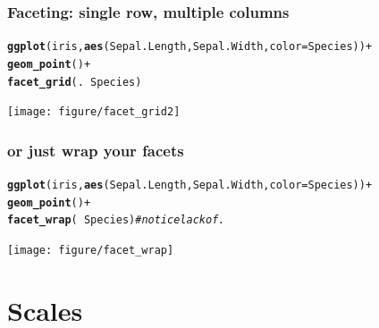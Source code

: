 \documentclass{beamer}\usepackage[]{graphicx}\usepackage[]{color}
\makeatletter
\newcommand{\hlcom}[1]{\textcolor[rgb]{0.678,0.584,0.686}{\textit{#1}}}%
\newcommand{\hlkwd}[1]{\textcolor[rgb]{0.737,0.353,0.396}{\textbf{#1}}}%
\newenvironment{kframe}{%
 \def\at@end@of@kframe{}%
 \ifinner\ifhmode%
  \def\at@end@of@kframe{\end{minipage}}%
  \begin{minipage}{\columnwidth}%
 \fi\fi%
 \def\FrameCommand##1{\hskip\@totalleftmargin \hskip-\fboxsep
 \colorbox{shadecolor}{##1}\hskip-\fboxsep
     \hskip-\linewidth \hskip-\@totalleftmargin \hskip\columnwidth}%
 \MakeFramed {\advance\hsize-\width
   \@totalleftmargin\z@ \linewidth\hsize
   \@setminipage}}%
 {\par\unskip\endMakeFramed%
 \at@end@of@kframe}
\newenvironment{knitrout}{}{} %
\makeatother
\begin{document}

\begin{frame}[fragile]
\frametitle{Faceting: single row, multiple columns}
\begin{knitrout}\footnotesize
{}\color{fgcolor}\begin{kframe}
\begin{alltt}
\hlkwd{ggplot}(iris, \hlkwd{aes}(Sepal.Length, Sepal.Width, color = Species)) +
\hlkwd{geom_point}() +
\hlkwd{facet_grid}(. ~ Species)
\end{alltt}
\end{kframe}

{\centering \texttt{[image: figure/facet\_grid2]} 

}



\end{knitrout}

\end{frame}


\begin{frame}[fragile]
\frametitle{or just wrap your facets}
\begin{knitrout}\footnotesize
{}\color{fgcolor}\begin{kframe}
\begin{alltt}
\hlkwd{ggplot}(iris, \hlkwd{aes}(Sepal.Length, Sepal.Width, color = Species)) +
\hlkwd{geom_point}() +
\hlkwd{facet_wrap}( ~ Species) \hlcom{# notice lack of .}
\end{alltt}
\end{kframe}

{\centering \texttt{[image: figure/facet\_wrap]} 

}



\end{knitrout}

\end{frame}


\section*{Scales}
\frame{\sectionpage}
\end{document}
